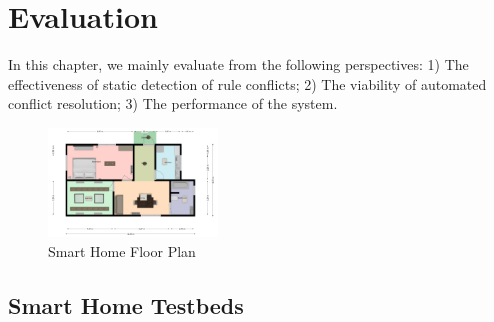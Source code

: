 \section{Evaluation}
In this chapter, we mainly evaluate from the following perspectives: 1) The effectiveness of static detection of rule conflicts; 2) The viability of automated conflict resolution; 3) The performance of the system.

\begin{figure}[htbp]
	\centering
	\includegraphics[width=0.4\textwidth]{figure/smarthome.png}
	\caption{Smart Home Floor Plan}
	\label{smarthome_floorplan}
\end{figure}

\subsection{Smart Home Testbeds}

